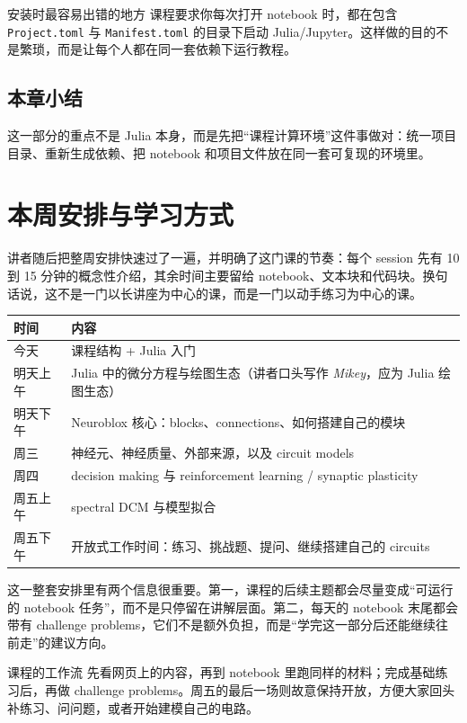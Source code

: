 \documentclass[a4paper]{article}
\begin{document}
\begin{knowledgebox}{安装时最容易出错的地方}
课程要求你每次打开 notebook 时，都在包含 \texttt{Project.toml} 与 \texttt{Manifest.toml} 的目录下启动 Julia/Jupyter。这样做的目的不是繁琐，而是让每个人都在同一套依赖下运行教程。
\end{knowledgebox}

\subsection{本章小结}
这一部分的重点不是 Julia 本身，而是先把“课程计算环境”这件事做对：统一项目目录、重新生成依赖、把 notebook 和项目文件放在同一套可复现的环境里。

\section{本周安排与学习方式}
讲者随后把整周安排快速过了一遍，并明确了这门课的节奏：每个 session 先有 10 到 15 分钟的概念性介绍，其余时间主要留给 notebook、文本块和代码块。换句话说，这不是一门以长讲座为中心的课，而是一门以动手练习为中心的课。

\begin{table}[H]
\centering
\begin{tabular}{@{}p{}p{}@{}}
\toprule
时间 & 内容 \\
\midrule
今天 & 课程结构 + Julia 入门 \\
明天上午 & Julia 中的微分方程与绘图生态（讲者口头写作 \emph{Mikey}，应为 Julia 绘图生态） \\
明天下午 & Neuroblox 核心：blocks、connections、如何搭建自己的模块 \\
周三 & 神经元、神经质量、外部来源，以及 circuit models \\
周四 & decision making 与 reinforcement learning / synaptic plasticity \\
周五上午 & spectral DCM 与模型拟合 \\
周五下午 & 开放式工作时间：练习、挑战题、提问、继续搭建自己的 circuits \\
\bottomrule
\end{tabular}
\end{table}

这一整套安排里有两个信息很重要。第一，课程的后续主题都会尽量变成“可运行的 notebook 任务”，而不是只停留在讲解层面。第二，每天的 notebook 末尾都会带有 challenge problems，它们不是额外负担，而是“学完这一部分后还能继续往前走”的建议方向。

\begin{importantbox}{课程的工作流}
先看网页上的内容，再到 notebook 里跑同样的材料；完成基础练习后，再做 challenge problems。周五的最后一场则故意保持开放，方便大家回头补练习、问问题，或者开始建模自己的电路。
\end{importantbox}
\end{document}
